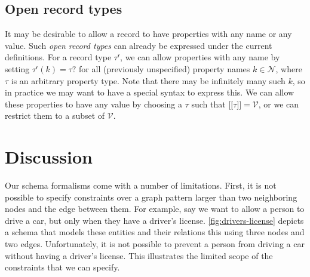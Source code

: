 \documentclass{article}
\theoremstyle{definition}
\newcommand{\ptype}{\tau}
\newcommand{\rtype}{\tau^\mathsf{r}}
\newcommand{\lsem}{\ensuremath{[\![}}
\newcommand{\rsem}{\ensuremath{]\!]}}
\newcommand{\sem}[1]{\ensuremath{\lsem #1 \rsem}}
\begin{document}
\subsection{Open record types}

It may be desirable to allow a record to have properties with any name or any value. Such \emph{open record types} can already be expressed under the current definitions. For a record type $\rtype$, we can allow properties with any name by setting $\rtype(k) = \ptype?$ for all (previously unspecified) property names $k \in \mathcal{N}$, where $\ptype$ is an arbitrary property type. Note that there may be infinitely many such $k$, so in practice we may want to have a special syntax to express this. We can allow these properties to have any value by choosing a $\ptype$ such that $\sem{\ptype} = \mathcal{V}$, or we can restrict them to a subset of $\mathcal{V}$.

\section{Discussion}


Our schema formalisms come with a number of limitations. First, it is not possible to specify constraints over a graph pattern larger than two neighboring nodes and the edge between them. For example, say we want to allow a person to drive a car, but only when they have a driver's license. \autoref{fig:drivers-license} depicts a schema that models these entities and their relations this using three nodes and two edges. Unfortunately, it is not possible to prevent a person from driving a car without having a driver's license. This illustrates the limited scope of the constraints that we can specify.
\end{document}
